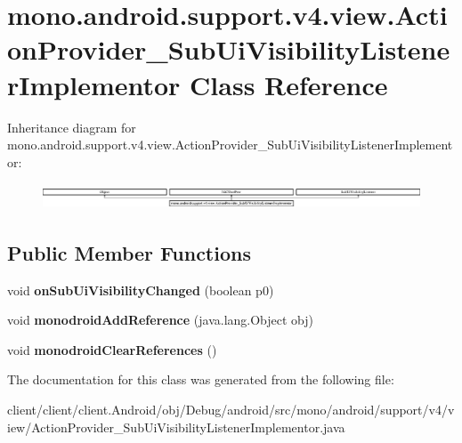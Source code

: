 \hypertarget{classmono_1_1android_1_1support_1_1v4_1_1view_1_1ActionProvider__SubUiVisibilityListenerImplementor}{}\section{mono.\+android.\+support.\+v4.\+view.\+Action\+Provider\+\_\+\+Sub\+Ui\+Visibility\+Listener\+Implementor Class Reference}
\label{classmono_1_1android_1_1support_1_1v4_1_1view_1_1ActionProvider__SubUiVisibilityListenerImplementor}
Inheritance diagram for mono.\+android.\+support.\+v4.\+view.\+Action\+Provider\+\_\+\+Sub\+Ui\+Visibility\+Listener\+Implementor\+:\begin{figure}[H]
\begin{center}
\leavevmode
\includegraphics[height=0.779402cm]{classmono_1_1android_1_1support_1_1v4_1_1view_1_1ActionProvider__SubUiVisibilityListenerImplementor}
\end{center}
\end{figure}
\subsection*{Public Member Functions}
\begin{DoxyCompactItemize}
\item 
\hypertarget{classmono_1_1android_1_1support_1_1v4_1_1view_1_1ActionProvider__SubUiVisibilityListenerImplementor_aa16b4664c4316a46993433708b3c1aaa}{}void {\bfseries on\+Sub\+Ui\+Visibility\+Changed} (boolean p0)\label{classmono_1_1android_1_1support_1_1v4_1_1view_1_1ActionProvider__SubUiVisibilityListenerImplementor_aa16b4664c4316a46993433708b3c1aaa}

\item 
\hypertarget{classmono_1_1android_1_1support_1_1v4_1_1view_1_1ActionProvider__SubUiVisibilityListenerImplementor_ad3bcf21e43259fd4af4b11e26ebea1bb}{}void {\bfseries monodroid\+Add\+Reference} (java.\+lang.\+Object obj)\label{classmono_1_1android_1_1support_1_1v4_1_1view_1_1ActionProvider__SubUiVisibilityListenerImplementor_ad3bcf21e43259fd4af4b11e26ebea1bb}

\item 
\hypertarget{classmono_1_1android_1_1support_1_1v4_1_1view_1_1ActionProvider__SubUiVisibilityListenerImplementor_aec92bae58c7fb25db74b6fc78f8d9eeb}{}void {\bfseries monodroid\+Clear\+References} ()\label{classmono_1_1android_1_1support_1_1v4_1_1view_1_1ActionProvider__SubUiVisibilityListenerImplementor_aec92bae58c7fb25db74b6fc78f8d9eeb}

\end{DoxyCompactItemize}


The documentation for this class was generated from the following file\+:\begin{DoxyCompactItemize}
\item 
client/client/client.\+Android/obj/\+Debug/android/src/mono/android/support/v4/view/Action\+Provider\+\_\+\+Sub\+Ui\+Visibility\+Listener\+Implementor.\+java\end{DoxyCompactItemize}
